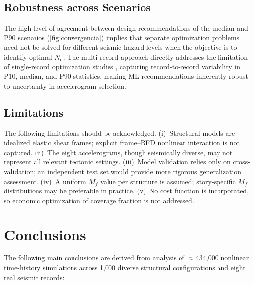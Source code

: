 \documentclass[preprint,12pt,authoryear]{elsarticle}
\newcommand{\nd}{N_{\mathrm{d}}}
\newcommand{\Mf}{M_{\!f}}
\begin{document}
\subsection{Robustness across Scenarios}

The high level of agreement between design recommendations of the median and P90 scenarios (\cref{fig:convergencia})
implies that separate optimization problems need not be solved for different seismic hazard levels when the
objective is to identify optimal $\nd$. The multi-record approach directly addresses the limitation of
single-record optimization studies \citep{Jarrahi2020jbe,Jarrahi2020sdee}, capturing record-to-record
variability in P10, median, and P90 statistics, making ML recommendations inherently robust to uncertainty
in accelerogram selection.

\subsection{Limitations}

The following limitations should be acknowledged. (i)~Structural models are idealized elastic shear frames;
explicit frame--RFD nonlinear interaction is not captured. (ii)~The eight accelerograms, though seismically
diverse, may not represent all relevant tectonic settings. (iii)~Model validation relies only on
cross-validation; an independent test set would provide more rigorous generalization assessment. (iv)~A
uniform $\Mf$ value per structure is assumed; story-specific $\Mf$ distributions may be preferable in
practice. (v)~No cost function is incorporated, so economic optimization of coverage fraction is not
addressed.

\section{Conclusions}
\label{sec:conclusions}

The following main conclusions are derived from analysis of $\approx$434,000 nonlinear time-history
simulations across 1,000 diverse structural configurations and eight real seismic records:
\end{document}

